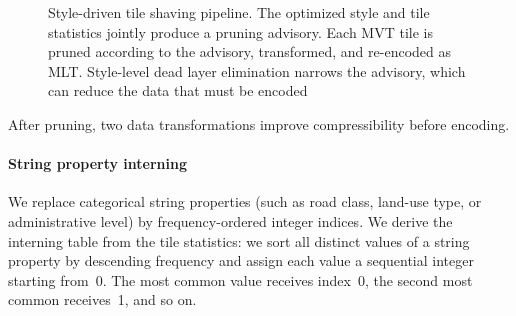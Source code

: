 {\begin{figure}[htbp]
    \caption{
Style-driven tile shaving pipeline.  The optimized style and tile statistics jointly produce a pruning advisory.  Each \ac{MVT} tile is pruned according to the advisory, transformed, and re-encoded as \ac{MLT}.  Style-level dead layer elimination narrows the advisory, which can reduce the data that must be encoded}
    \label{fig:tile_shaving_pipeline}
\end{figure}

\noindent After pruning, two data transformations improve compressibility before encoding.

\paragraph{String property interning}\label{sub:string_property_interning}
We replace categorical string properties (such as road class, land-use type, or administrative level) by frequency-ordered integer indices.
We derive the interning table from the tile statistics: we sort all distinct values of a string property by descending frequency and assign each value a sequential integer starting from~0.
The most common value receives index~0, the second most common receives~1, and so on.

}
